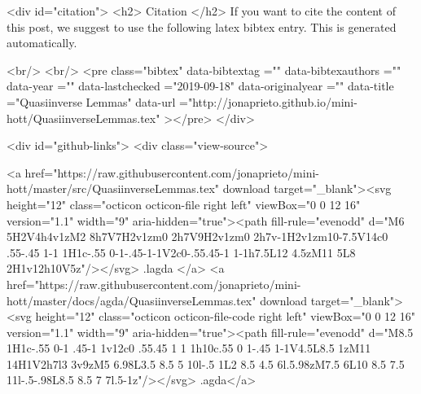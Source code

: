   
  <div id="citation">
  <h2> Citation </h2>
  If you want to cite the content of this post,
  we suggest to use the following latex bibtex entry.
  This is generated automatically.

  <br/>
  <br/>
  <pre class="bibtex"
       data-bibtextag =""
       data-bibtexauthors =""
       data-year =""
       data-lastchecked ="2019-09-18"
       data-originalyear =""
       data-title ="Quasiinverse Lemmas"
       data-url ="http://jonaprieto.github.io/mini-hott/QuasiinverseLemmas.tex"
  ></pre>
  </div>
  

  <div id="github-links">
    <div class="view-source">
      
        <a href="https://raw.githubusercontent.com/jonaprieto/mini-hott/master/src/QuasiinverseLemmas.tex" download target="_blank"><svg height="12" class="octicon octicon-file right left" viewBox="0 0 12 16" version="1.1" width="9" aria-hidden="true"><path fill-rule="evenodd" d="M6 5H2V4h4v1zM2 8h7V7H2v1zm0 2h7V9H2v1zm0 2h7v-1H2v1zm10-7.5V14c0 .55-.45 1-1 1H1c-.55 0-1-.45-1-1V2c0-.55.45-1 1-1h7.5L12 4.5zM11 5L8 2H1v12h10V5z"/></svg> .lagda </a>
        <a href="https://raw.githubusercontent.com/jonaprieto/mini-hott/master/docs/agda/QuasiinverseLemmas.tex" download target="_blank"><svg height="12" class="octicon octicon-file-code right left" viewBox="0 0 12 16" version="1.1" width="9" aria-hidden="true"><path fill-rule="evenodd" d="M8.5 1H1c-.55 0-1 .45-1 1v12c0 .55.45 1 1 1h10c.55 0 1-.45 1-1V4.5L8.5 1zM11 14H1V2h7l3 3v9zM5 6.98L3.5 8.5 5 10l-.5 1L2 8.5 4.5 6l.5.98zM7.5 6L10 8.5 7.5 11l-.5-.98L8.5 8.5 7 7l.5-1z"/></svg> .agda</a>
      
